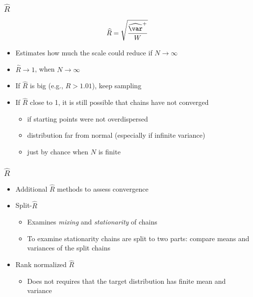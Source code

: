 \documentclass[10pt]{beamer}
\begin{document}
\begin{frame}

\frametitle{ $\widehat{R}$}

  \begin{equation*}
      \widehat{R}=\sqrt{\frac{\widehat{\var}^{+}}{W}}
    \end{equation*}
    \begin{itemize}
    \item<1-> Estimates how much the scale could reduce if $N\rightarrow\infty$
    \item<1-> $\widehat{R}\rightarrow 1$, when $N\rightarrow\infty$
    \item<1-> If $\widehat{R}$ is big (e.g., $R>1.01$), keep sampling
    \item<2-> If $\widehat{R}$ close to 1, it is still possible that chains have not converged
      \begin{itemize}
      \item if starting points were not overdispersed
      \item distribution far from normal (especially if infinite variance)
      \item just by chance when $N$ is finite
      \end{itemize}
    \end{itemize}

\end{frame}

\begin{frame}[fragile]

\frametitle{$\widehat{R}$}

  \begin{itemize}
  \item Additional $\widehat{R}$ methods to assess convergence
  \item Split-$\widehat{R}$
  \begin{itemize}
    \item Examines {\it mixing} and {\it stationarity} of chains
    \item To examine stationarity chains are split to two parts: compare means and variances of the split chains
  \end{itemize}
  \pause
  \item Rank normalized $\widehat{R}$
  \begin{itemize}
    \item Does not requires that the target distribution has finite mean and variance
  \end{itemize}
  \end{itemize}

\end{frame}
\end{document}
